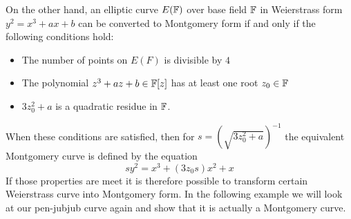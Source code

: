 On the other hand, an elliptic curve $E(\mathbb{F})$ over base field $\mathbb{F}$ in Weierstrass form $y^2 = x^3 + a x + b$ can be converted to Montgomery form if and only if the following conditions hold:
\begin{itemize}
\item The number of points on $E(F)$ is divisible by $4$
\item The polynomial $z^3 + a z + b \in \mathbb{F}[z]$ has at least one root $z_0\in\mathbb{F}$
\item $3z_0^2 + a$ is a quadratic residue in $\mathbb{F}$.
\end{itemize}
When these conditions are satisfied, then for $s=({\sqrt{3z_0^{2}+a}})^{-1}$ the equivalent Montgomery curve is defined by the equation
$$
sy^{2}=x^{3}+(3z_0 s)x^{2}+x
$$
If those properties are meet it is therefore possible to transform certain Weierstrass curve into Montgomery form. In the following example we will look at our pen-jubjub curve again and show that it is actually a Montgomery curve.
